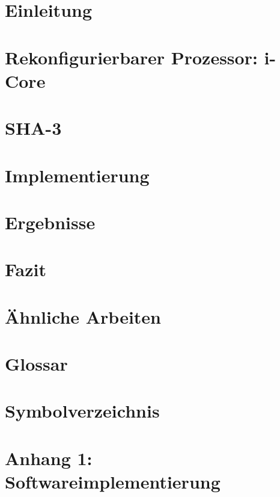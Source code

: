 \chapter{Einleitung}


\chapter{Rekonfigurierbarer Prozessor: i-Core}


\chapter{SHA-3}


\chapter{Implementierung}


\newpage

\newpage


\chapter{Ergebnisse}
\label{cha:ergebnisse}


\chapter{Fazit}


\chapter{Ähnliche Arbeiten}


\chapter{Glossar}


\chapter{Symbolverzeichnis}


\chapter{Anhang 1: Softwareimplementierung}
\label{cha:anhang1}

